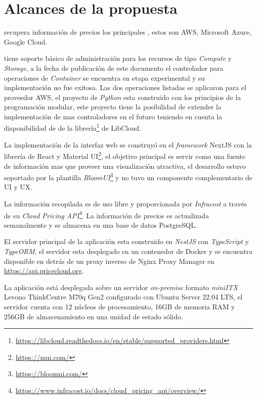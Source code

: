 \chapter{Alcances de la propuesta} %

\label{ch:alcances} %



\appName recupera información de precios los principales , estos son \acrshort{AWS}, \gls{Microsoft Azure}, \gls{Google Cloud}.\bigskip

\appName tiene soporte básico de administración para los recursos de tipo \emph{Compute} y \emph{Storage}, a la fecha de publicación de este documento el controlador para operaciones de \emph{Container} se encuentra en etapa experimental y su implementación no fue exitosa. Las dos operaciones listadas se aplicaron para el proveedor \acrshort{AWS}, el proyecto de \emph{Python} esta construido con los principios de la programación modular, este proyecto tiene la posibilidad de extender la implementación de mas controladores en el futuro teniendo en cuenta la disponibilidad de  de la librería\footnote{\url{https://libcloud.readthedocs.io/en/stable/supported_providers.html}} de \gls{LibCloud}. \bigskip

La implementación de la interfaz web se construyó en el \emph{framework} \gls{NextJS} con la librería de \gls{React} y \gls{Material UI}\footnote{\url{https://mui.com/}}, el objetivo principal es servir como una fuente de información mas que proveer una visualización atractiva, el desarrollo estuvo soportado por la plantilla \emph{BloomUI}\footnote{\url{https://bloomui.com/}} y no tuvo un componente complementario de \acrshort{UI} y \acrshort{UX}.\bigskip

La información recopilada es de uso libre y proporcionada por \emph{Infracost} a través de su \emph{Cloud Pricing API}\footnote{\url{https://www.infracost.io/docs/cloud_pricing_api/overview/}}. La información de precios es actualizada semanalmente y se almacena en una base de datos \gls{PostgreSQL}.\bigskip

El servidor principal de la aplicación esta construido en \emph{NestJS} con \emph{TypeScript} y \emph{TypeORM}, el servidor esta desplegado en un contenedor de \gls{Docker} y se encuentra disponible en detrás de un proxy inverso de \gls{Nginx Proxy Manager} en \url{https://api.pricecloud.org}.\bigskip

La aplicación está desplegada sobre un servidor \emph{on-premise} formato \emph{miniITX} Levono ThinkCentre M70q Gen2 configurado con Ubuntu Server 22.04 LTS, el servidor cuenta con 12 núcleos de procesamiento, 16GB de memoria RAM y 256GB de almacenamiento en una unidad de estado sólido.\bigskip
